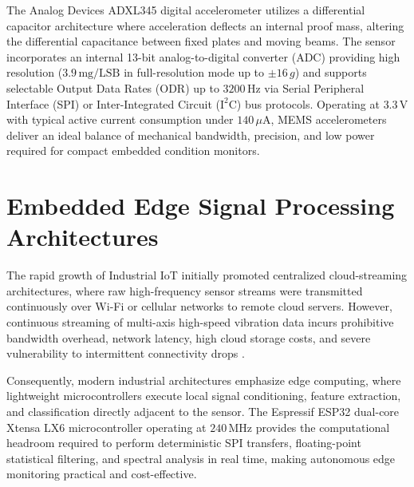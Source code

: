 \hspace{2em}The Analog Devices ADXL345 digital accelerometer utilizes a differential capacitor architecture where acceleration deflects an internal proof mass, altering the differential capacitance between fixed plates and moving beams. The sensor incorporates an internal 13-bit analog-to-digital converter (ADC) providing high resolution ($3.9\,\text{mg/LSB}$ in full-resolution mode up to $\pm16\,g$) and supports selectable Output Data Rates (ODR) up to $3200\,\text{Hz}$ via Serial Peripheral Interface (SPI) or Inter-Integrated Circuit ($\mathrm{I}^2\mathrm{C}$) bus protocols. Operating at $3.3\,\text{V}$ with typical active current consumption under $140\,\mu\text{A}$, MEMS accelerometers deliver an ideal balance of mechanical bandwidth, precision, and low power required for compact embedded condition monitors.

\section{Embedded Edge Signal Processing Architectures}
\hspace{2em}The rapid growth of Industrial IoT initially promoted centralized cloud-streaming architectures, where raw high-frequency sensor streams were transmitted continuously over Wi-Fi or cellular networks to remote cloud servers. However, continuous streaming of multi-axis high-speed vibration data incurs prohibitive bandwidth overhead, network latency, high cloud storage costs, and severe vulnerability to intermittent connectivity drops \cite{esp32devkitc}.

\hspace{2em}Consequently, modern industrial architectures emphasize edge computing, where lightweight microcontrollers execute local signal conditioning, feature extraction, and classification directly adjacent to the sensor. The Espressif ESP32 dual-core Xtensa LX6 microcontroller operating at $240\,\text{MHz}$ provides the computational headroom required to perform deterministic SPI transfers, floating-point statistical filtering, and spectral analysis in real time, making autonomous edge monitoring practical and cost-effective.

